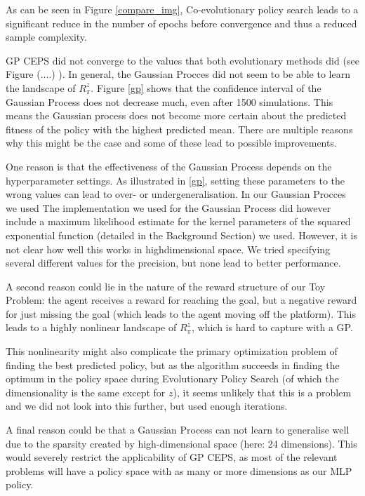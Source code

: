 As can be seen in Figure \ref{compare_img}, Co-evolutionary policy search leads to a significant reduce in the number of epochs before convergence and thus a reduced sample complexity. 

GP CEPS did not converge to the values that both evolutionary methods did (see Figure (....) ). In general, the Gaussian Procces did not seem to be able to learn the landscape of $R_{\pi}^z$. Figure \ref{gp} shows that the confidence interval of the Gaussian Process does not decrease much, even after 1500 simulations. This means the Gaussian process does not become more certain about the predicted fitness of the policy with the highest predicted mean.
There are multiple reasons why this might be the case and some of these lead to possible improvements. 

One reason is that the effectiveness of the Gaussian Process depends on the hyperparameter settings. As illustrated in \ref{gp}, setting these parameters to the wrong values can lead to over- or undergeneralisation. In our Gaussian Procces we used  The implementation we used for the Gaussian Process did however include a maximum likelihood estimate for the kernel parameters of the squared exponential function (detailed in the Background Section) we used. However, it is not clear how well this works in highdimensional space. We tried specifying several different values for the precision, but none lead to better performance. 

A second reason could lie in the nature of the reward   structure of our Toy Problem: the agent receives a reward for reaching the goal, but a negative reward for just missing the goal (which leads to the agent moving off the platform). This leads to a highly nonlinear landscape of $R_{\pi}^z$, which is hard to capture with a GP. 

This nonlinearity might also complicate the primary optimization problem of finding the best predicted policy, but as the algorithm succeeds in finding the optimum in the policy space during Evolutionary Policy Search (of which the dimensionality is the same except for $z$), it seems unlikely that this is a problem and we did not look into this further, but used enough iterations.

A final reason could be that a Gaussian Process can not learn to generalise well due to the sparsity created by high-dimensional space (here: 24 dimensions). This would severely restrict the applicability of GP CEPS, as most of the relevant problems will have a policy space with as many or more dimensions as our MLP policy.

